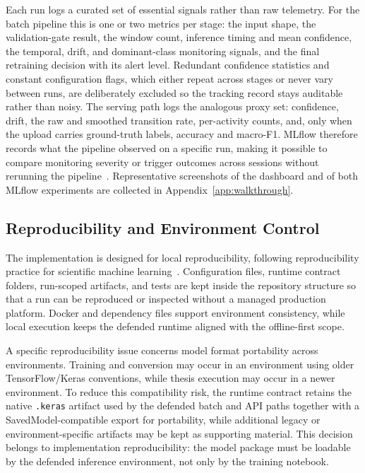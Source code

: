 Each run logs a curated set of essential signals rather than raw telemetry. For the batch pipeline this is one or two metrics per stage: the input shape, the validation-gate result, the window count, inference timing and mean confidence, the temporal, drift, and dominant-class monitoring signals, and the final retraining decision with its alert level. Redundant confidence statistics and constant configuration flags, which either repeat across stages or never vary between runs, are deliberately excluded so the tracking record stays auditable rather than noisy. The serving path logs the analogous proxy set: confidence, drift, the raw and smoothed transition rate, per-activity counts, and, only when the upload carries ground-truth labels, accuracy and macro-F1. MLflow therefore records what the pipeline observed on a specific run, making it possible to compare monitoring severity or trigger outcomes across sessions without rerunning the pipeline~\cite{zaharia2018mlflow}. Representative screenshots of the dashboard and of both MLflow experiments are collected in Appendix~\ref{app:walkthrough}.

\subsection{Reproducibility and Environment Control}
\label{sec:reproducibility_environment}

The implementation is designed for local reproducibility, following reproducibility practice for scientific machine learning~\cite{gardner2018enabling,bahaidarah2021reusable,munappy2019data}. Configuration files, runtime contract folders, run-scoped artifacts, and tests are kept inside the repository structure so that a run can be reproduced or inspected without a managed production platform. Docker and dependency files support environment consistency, while local execution keeps the defended runtime aligned with the offline-first scope.

A specific reproducibility issue concerns model format portability across environments. Training and conversion may occur in an environment using older TensorFlow/Keras conventions, while thesis execution may occur in a newer environment. To reduce this compatibility risk, the runtime contract retains the native \texttt{.keras} artifact used by the defended batch and API paths together with a SavedModel-compatible export for portability, while additional legacy or environment-specific artifacts may be kept as supporting material. This decision belongs to implementation reproducibility: the model package must be loadable by the defended inference environment, not only by the training notebook.

